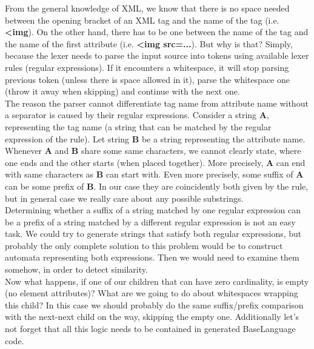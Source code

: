 From the general knowledge of XML, we know that there is no space needed between the opening bracket of an XML tag and the name of the tag (i.e. \textbf{{\textless}img}).
On the other hand, there has to be one between the name of the tag and the name of the first attribute (i.e. \textbf{{\textless}img src=...}).
But why is that?
Simply, because the lexer needs to parse the input source into tokens using available lexer rules (regular expressions).
If it encounters a whitespace, it will stop parsing previous token (unless there is space allowed in it), parse the whitespace one (throw it away when skipping) and continue with the next one.
\\

The reason the parser cannot differentiate tag name from attribute name without a separator is caused by their regular expressions.
Consider a string \textbf{A}, representing the tag name (a string that can be matched by the regular expression of the  rule).
Let string \textbf{B} be a string representing the attribute name.
Whenever \textbf{A} and \textbf{B} share some same characters, we cannot clearly state, where one ends and the other starts (when placed together).
More precisely, \textbf{A} can end with same characters as \textbf{B} can start with.
Even more precisely, some suffix of \textbf{A} can be some prefix of \textbf{B}.
In our case they are coincidently both given by the  rule, but in general case we really care about any possible substrings.
\\

Determining whether a suffix of a string matched by one regular expression can be a prefix of a string matched by a different regular expression is not an easy task.
We could try to generate strings that satisfy both regular expressions, but probably the only complete solution to this problem would be to construct automata representing both expressions.
Then we would need to examine them somehow, in order to detect similarity.
\\

Now what happens, if one of our children that can have zero cardinality, is empty (no element attributes)?
What are we going to do about whitespaces wrapping this child?
In this case we should probably do the same suffix/prefix comparison with the next-next child on the way, skipping the empty one.
Additionally let's not forget that all this logic needs to be contained in generated BaseLanguage code.
\\

